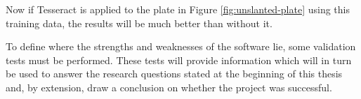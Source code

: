 Now if Tesseract is applied to the plate in Figure \ref{fig:unslanted-plate} using this training data, the results will be much better than without it.


To define where the strengths and weaknesses of the software lie, some validation tests must be performed. These tests will provide information which will in turn be used to answer the research questions stated at the beginning of this thesis and, by extension, draw a conclusion on whether the project was successful.


